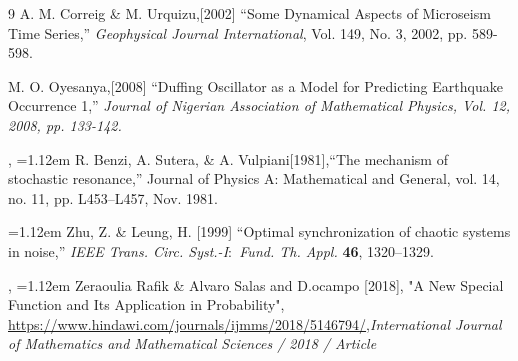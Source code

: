 \documentclass{ws-ijbc}
\begin{document}
\begin{thebibliography}{9}
A. M. Correig \& M. Urquizu,[2002] “Some Dynamical Aspects of Microseism Time Series,” {\it Geophysical Journal International}, Vol. 149, No. 3, 2002, pp. 589-598.


M. O. Oyesanya,[2008] “Duffing Oscillator as a Model for Predicting Earthquake Occurrence 1,” {\it Journal of Nigerian Association of Mathematical Physics, Vol. 12, 2008, pp. 133-142.}




, 
\hangindent=1.12em R. Benzi, A. Sutera, \& A. Vulpiani[1981],“The mechanism of stochastic resonance,” Journal of
Physics A: Mathematical and General, vol. 14, no. 11, pp. L453–L457, Nov. 1981.

\hangindent=1.12em Zhu, Z. \& Leung, H. [1999] ``Optimal synchronization of chaotic systems in
noise,'' {\it IEEE Trans. Circ. Syst.-I\/$:$ Fund. Th. Appl.} {\bf 46},
1320--1329.


, 
\hangindent=1.12em  Zeraoulia Rafik \& Alvaro Salas and D.ocampo [2018], "A New Special Function and Its Application in Probability", \url{https://www.hindawi.com/journals/ijmms/2018/5146794/},{\it International Journal of Mathematics and Mathematical Sciences / 2018 / Article}

\end{thebibliography}
\end{document}
